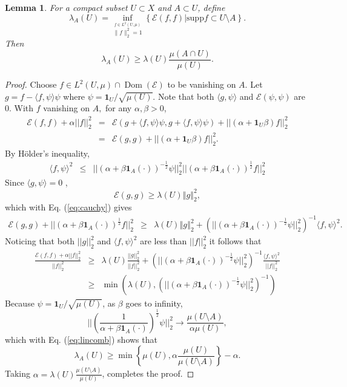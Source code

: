 \documentclass[letterpaper,oneside,english]{amsart}
\newtheorem{lem}{Lemma}
\begin{document}
\begin{lem}
\label{Thirring's inequality} For a compact subset $U\subset X$
and $A\subset U$, define \[
\lambda_{A}(U)=\inf_{\stackrel{{\scriptstyle f\in L^{2}(U,\mu)}}{\|f\|_{2}^{2}=1}}\left\{ \mathcal{E}(f,f)|\mathrm{supp}f\subset U\setminus A\right\} .\]
 Then \[
\lambda_{A}(U)\ge\lambda(U)\frac{\mu(A\cap U)}{\mu(U)}.\]
 
\end{lem}
\begin{proof}
Choose $f\in L^{2}\left(U,\mu \right) \cap {\operatorname{Dom}}({\mathcal{E}})$ to be vanishing on $A.$ Let
$g=f-\langle f,\psi\rangle \psi$ where $\psi=\mathbf{1}_{U}/\sqrt{\mu(U)}$.  Note that both $\langle g,\psi\rangle$ and $\mathcal{E}(\psi,\psi)$ are 0.  With $f$ vanishing on $A,$ for any $\alpha,\beta>0$, 
\begin{eqnarray*}
 \mathcal{E}(f,f) + \alpha||f||_2^2 
&=& \mathcal{E}(g+\langle f,\psi\rangle \psi,g+\langle f,\psi\rangle \psi) + ||(\alpha +\mathbf{1}_{U}\beta) f||_2^2 \\
&=& \mathcal{E}(g,g) + ||(\alpha +\mathbf{1}_{U}\beta) f||_2^2 .
 \end{eqnarray*}
 By H\"{o}lder's inequality, \begin{eqnarray}
\langle f,\psi\rangle^{2}
 & \le & ||\left(\alpha+\beta\mathbf{1}_{A}(\cdot)\right)^{- \frac{1}{2}}\psi||_2^2
  ||\left(\alpha+\beta\mathbf{1}_{A}(\cdot)\right)^{\frac{1}{2}} f||_2^{2} \label{eq:cauchy} 
  \end{eqnarray}
 Since $\langle g,\psi\rangle=0$ , \[\mathcal{E}(g,g) \ge\lambda(U)\left\Vert g\right\Vert _{2}^{2},\]
 which with Eq. (\ref{eq:cauchy}) gives
 \begin{eqnarray*}
 \mathcal{E}(g,g) +||\left(\alpha+\beta\mathbf{1}_{A}(\cdot)\right)^{\frac{1}{2}} f||_2^{2}
 & \geq & 
 \lambda(U)\left\Vert g\right\Vert _{2}^{2} + \left(  ||\left(\alpha+\beta\mathbf{1}_{A}(\cdot)\right)^{- \frac{1}{2}}\psi||_2^2
 \right)^{-1} \langle f,\psi\rangle^{2} .
 \end{eqnarray*}
 Noticing that both $||g||_2^2$ and $\langle f,\psi\rangle^{2}$ are less than $||f||_2^2$
it follows that 
\begin{eqnarray}
\frac{ \mathcal{E}(f,f) + \alpha||f||_2^2}{||f||_2^2} 
&\ge& \lambda(U)\frac{|| g||_{2}^{2}}{||f||_2^2} + \left(  ||\left(\alpha+\beta\mathbf{1}_{A}(\cdot) \right)^{- \frac{1}{2}}\psi||_2^2
 \right)^{-1} \frac{\langle f,\psi\rangle^{2}}{||f||_2^2} \nonumber \\
 & \ge & \min\left(\lambda(U), \left(  ||\left( \alpha+\beta\mathbf{1}_{A}(\cdot) \right)^{- \frac{1}{2}}\psi||_2^2 \right)^{-1}  \right) \label{eq:lincomb}
 \end{eqnarray}
 Because $\psi = \mathbf{1}_{U}/\sqrt{\mu(U)}$, as $\beta$ goes to infinity,\[
||\left(\frac{1}{\alpha+\beta\mathbf{1}_{A}(\cdot)}\right)^{\frac{1}{2}}\psi||_2^2
\rightarrow\frac{\mu\left(U\setminus A\right)}{\alpha \mu(U)},\]
 which with Eq. (\ref{eq:lincomb}) shows that\[
\lambda_{A}(U)\geq\min\left\{ \mu(U),\alpha\frac{\mu(U)}{\mu\left(U\setminus A\right)}\right\} -\alpha.\]
 Taking $\alpha=\lambda(U)\frac{\mu\left(U\setminus A\right)}{\mu(U)}$, completes
the proof.
\end{proof}
 
\end{document}
